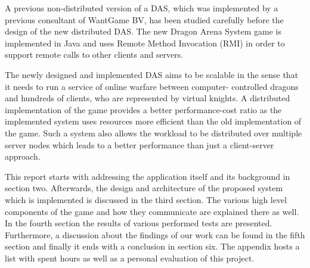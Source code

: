 \documentclass{article}
\begin{document}
A previous non-distributed version of a DAS, which was implemented by a previous consultant of WantGame BV, has been studied carefully before the design of the new distributed DAS.
The new Dragon Arena System game is implemented in Java and uses Remote Method Invocation (RMI) in order to support remote calls to other clients and servers.

The newly designed and implemented DAS aims to be scalable in the sense that it needs to run a service of online warfare between computer- controlled dragons and hundreds of clients, who are represented by virtual knights. 
A distributed implementation of the game provides a better performance-cost ratio as the implemented system uses resources more efficient than the old implementation of the game.
Such a system also allows the workload to be distributed over multiple server nodes which leads to a better performance than just a client-server approach.

This report starts with addressing the application itself and its background in section two.
Afterwards, the design and architecture of the proposed system which is implemented is discussed in the third section.
The various high level components of the game and how they communicate are explained there as well.
In the fourth section the results of various performed tests are presented. 
Furthermore, a discussion about the findings of our work can be found in the fifth section and finally it ends with a conclusion in section six. The appendix hosts a list with spent hours as well as a personal evaluation of this project.

\newpage









  



\nocite{*}


\end{document}

